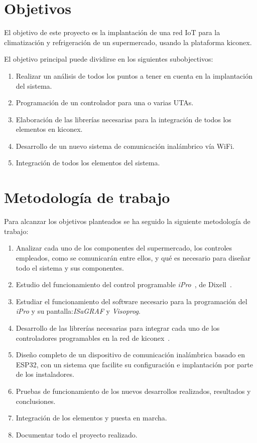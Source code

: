 \section{Objetivos}
\label{sec:objetivos}

El objetivo de este proyecto es la implantación de una red IoT para la climatización y refrigeración de un supermercado, usando la plataforma kiconex.

El objetivo principal puede dividirse en los siguientes subobjectivos:

\begin{enumerate}
  \item Realizar un análisis de todos los puntos a tener en cuenta en la implantación del sistema.
  \item Programación de un controlador para una o varias UTAs.
  \item Elaboración de las librerías necesarias para la integración de todos los elementos en kiconex.
  \item Desarrollo de un nuevo sistema de comunicación inalámbrico vía WiFi.
  \item Integración de todos los elementos del sistema.
\end{enumerate}

\section{Metodología de trabajo}
\label{sec:metodologia}

Para alcanzar los objetivos planteados se ha seguido la siguiente metodología de trabajo:

\begin{enumerate}
\item Analizar cada uno de los componentes del supermercado, los controles empleados, como se comunicarán entre ellos, y qué es necesario para diseñar todo el sistema y sus componentes.
\item Estudio del funcionamiento del control programable \textit{iPro}~\cite{iproManual}, de Dixell~\cite{marcaDixell}.
\item Estudiar el funcionamiento del software necesario para la programación del \textit{iPro} y su pantalla:\textit{ISaGRAF} y \textit{Visoprog}.
\item Desarrollo de las librerías necesarias para integrar cada uno de los controladores programables en la red de kiconex~\cite{queEsKiconex}.
\item Diseño completo de un dispositivo de comunicación inalámbrica basado en ESP32, con un sistema que facilite su configuración e implantación por parte de los instaladores.
\item Pruebas de funcionamiento de los nuevos desarrollos realizados, resultados y conclusiones.
\item Integración de los elementos y puesta en marcha.
\item Documentar todo el proyecto realizado.
\end{enumerate}



